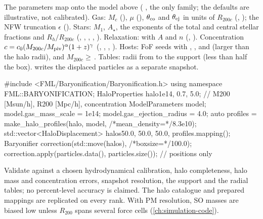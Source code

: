 The parameters map onto the model above ( , the only family; the
defaults are illustrative, not calibrated). Gas: $M_c$ (), $\mu$
(), $\theta_{\rm co}$ and $\theta_{\rm ej}$ in units of $R_{200c}$
(, ); the NFW
truncation $\epsilon$ (). Stars: $M_1$, $A_\star$, the exponents of the
total and central stellar fractions and $R_h/R_{200c}$ (,
, ,
, ). Relaxation:
 with $A$ and $n$ (,
). Concentration $c=c_0(M_{200c}/M_{\rm piv})^{\alpha}(1+z)^{\gamma}$
(, ,
, ). Hosts: FoF seeds
with , ,
 and  (larger than the halo radii), and
$M_{200c}\ge$\,. Tables:  radii from
 to the support  (less than half the
box).  writes the displaced particles as a separate snapshot.

\begin{cppcode}
#include <FML/Baryonification/Baryonification.h>
using namespace FML::BARYONIFICATION;
HaloProperties halo{1e14, 0.7, 5.0};               // M200 [Msun/h], R200 [Mpc/h], concentration
ModelParameters model;
model.gas_mass_scale = 1e14;  model.gas_ejection_radius = 4.0;
auto profiles = make_halo_profiles(halo, model, /*mean_density=*/8.3e10);
std::vector<HaloDisplacement> halos{{{50.0, 50.0, 50.0}, profiles.mapping()}};
Baryonifier correction(std::move(halos), /*boxsize=*/100.0);
correction.apply(particles.data(), particles.size());   // positions only
\end{cppcode}

\begin{caveat}
Validate against a chosen hydrodynamical calibration, halo completeness, halo mass and concentration errors, snapshot
resolution, the support and the radial tables; no percent-level accuracy is claimed. The halo catalogue and prepared
mappings are replicated on every rank. With PM resolution, SO masses are biased low unless $R_{200}$ spans several force
cells (\cref{ch:simulation-code}).
\end{caveat}
